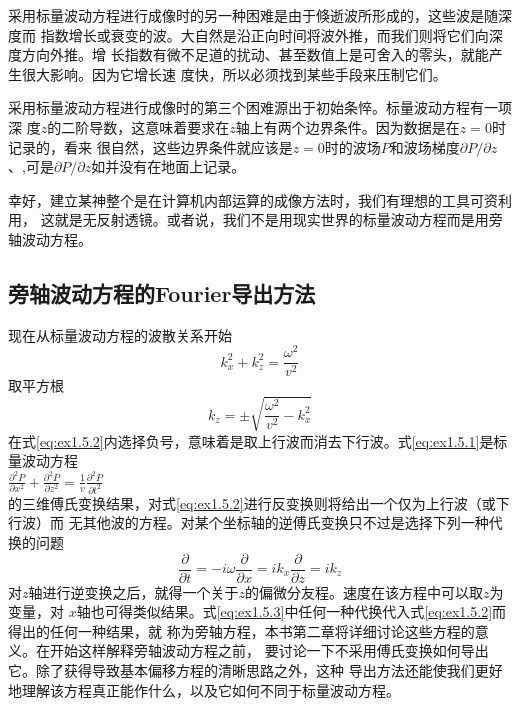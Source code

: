 采用标量波动方程进行成像时的另一种困难是由于倏逝波所形成的，这些波是随深度而
指数增长或衰变的波。大自然是沿正向时间将波外推，而我们则将它们向深度方向外推。增
长指数有微不足道的扰动、甚至数值上是可舍入的零头，就能产生很大影响。因为它增长速
度快，所以必须找到某些手段来压制它们。

采用标量波动方程进行成像时的第三个困难源出于初始条悴。标量波动方程有一项深
度$z$的二阶导数，这意味着要求在$z$轴上有两个边界条件。因为数据是在$z=0$时记录的，看来
很自然，这些边界条件就应该是$z=0$时的波场$P$和波场梯度$\partial P/\partial z$、,可是$\partial P/\partial z$如并没有在地面上记录。

幸好，建立某神整个是在计算机内部运算的成像方法时，我们有理想的工具可资利用，
这就是无反射透镜。或者说，我们不是用现实世界的标量波动方程而是用旁轴波动方程。

\subsection{旁轴波动方程的Fourier导出方法}
现在从标量波动方程的波散关系开始
\begin{equation}
k_x^2+k_z^2=\frac{\omega^2}{v^2}
\label{eq:ex1.5.1}
\end{equation}
取平方根
\begin{equation}
k_z=\pm\sqrt{\frac{\omega^2}{v^2}-k_x^2}
\label{eq:ex1.5.2}
\end{equation}
在式\ref{eq:ex1.5.2}内选择负号，意味着是取上行波而消去下行波。式\ref{eq:ex1.5.1}是标量波动方程\\
$\frac{\partial^2 P}{\partial x^2}+\frac{\partial^2 P}{\partial z^2}=\frac{1}{v}\frac{\partial^2 P}{\partial t^2}$\\
的三维傅氏变换结果，对式\ref{eq:ex1.5.2}进行反变换则将给出一个仅为上行波（或下行波）而
无其他波的方程。对某个坐标轴的逆傅氏变换只不过是选择下列一种代换的问题
\begin{subequations}\label{eq:ex1.5.3}
\begin{equation}
\frac{\partial}{\partial t}=-i\omega
\end{equation}
\begin{equation}
\frac{\partial}{\partial x}=ik_x
\end{equation}
\begin{equation}
\frac{\partial}{\partial z}=ik_z
\end{equation}
\end{subequations}
对$z$轴进行逆变换之后，就得一个关于$z$的偏微分友程。速度在该方程中可以取$z$为变量，对
$x$轴也可得类似结果。式\ref{eq:ex1.5.3}中任何一种代换代入式\ref{eq:ex1.5.2}而得出的任何一种结果，就
称为旁轴方程，本书第二章将详细讨论这些方程的意义。在开始这样解释旁轴波动方程之前，
要讨论一下不采用傅氏变换如何导出它。除了获得导致基本偏移方程的清晰思路之外，这种
导出方法还能使我们更好地理解该方程真正能作什么，以及它如何不同于标量波动方程。
